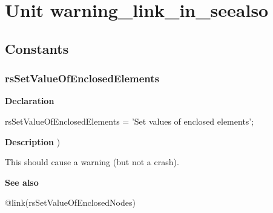 \documentclass{report}
\begin{document}
\newlength{\tmplength}
\chapter{Unit warning{\_}link{\_}in{\_}seealso}
\section{Constants}
\subsection*{rsSetValueOfEnclosedElements}
\begin{list}{}{
\setlength{\itemindent}{0cm}
\setlength{\listparindent}{0cm}
\setlength{\leftmargin}{\evensidemargin}
\addtolength{\leftmargin}{\tmplength}
\settowidth{\labelsep}{X}
\addtolength{\leftmargin}{\labelsep}
\setlength{\labelwidth}{\tmplength}
}
\begin{flushleft}
\item[\textbf{Declaration}\hfill]
\begin{ttfamily}
rsSetValueOfEnclosedElements = 'Set values of enclosed elements';\end{ttfamily}


\end{flushleft}
\par
\item[\textbf{Description}]
)

This should cause a warning (but not a crash).\item[\textbf{See also}]
\begin{description}
\item[@link(rsSetValueOfEnclosedNodes)] 

\end{description}


\end{list}
\end{document}
